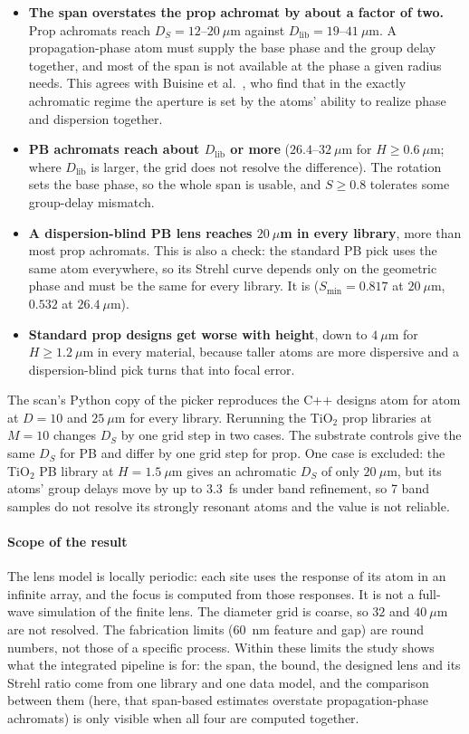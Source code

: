 \documentclass[preprint,12pt]{elsarticle}
\begin{document}
\begin{itemize}
\item \textbf{The span overstates the prop achromat by about a factor of two.} Prop
      achromats reach $D_S=12$--$20~\mu$m against $D_\mathrm{lib}=19$--$41~\mu$m. A
      propagation-phase atom must supply the base phase and the group delay together, and
      most of the span is not available at the phase a given radius needs. This agrees
      with Buisine et al.~\cite{buisine2026}, who find that in the exactly achromatic
      regime the aperture is set by the atoms' ability to realize phase and dispersion
      together.
\item \textbf{PB achromats reach about $D_\mathrm{lib}$ or more} ($26.4$--$32~\mu$m for
      $H\ge0.6~\mu$m; where $D_\mathrm{lib}$ is larger, the grid does not resolve the
      difference). The rotation sets the base phase, so the whole span is usable, and
      $S\ge0.8$ tolerates some group-delay mismatch.
\item \textbf{A dispersion-blind PB lens reaches $20~\mu$m in every library}, more than
      most prop achromats. This is also a check: the standard PB pick uses the same atom
      everywhere, so its Strehl curve depends only on the geometric phase and must be the
      same for every library. It is ($S_\mathrm{min}=0.817$ at $20~\mu$m, $0.532$ at
      $26.4~\mu$m).
\item \textbf{Standard prop designs get worse with height}, down to $4~\mu$m for
      $H\ge1.2~\mu$m in every material, because taller
      atoms are more dispersive and a dispersion-blind pick turns that into focal error.
\end{itemize}
The scan's Python copy of the picker reproduces the C++ designs atom for atom at
$D=10$ and $25~\mu$m for every library. Rerunning the TiO$_2$ prop libraries at $M=10$
changes $D_S$ by one grid step in two cases. The substrate controls give the same $D_S$
for PB and differ by one grid step for prop. One case is excluded: the TiO$_2$ PB library at
$H=1.5~\mu$m gives an achromatic $D_S$ of only $20~\mu$m, but its atoms' group delays move
by up to $3.3$~fs under band refinement, so 7 band samples do not resolve its strongly
resonant atoms and the value is not reliable.

\paragraph{Scope of the result}
The lens model is locally periodic: each site uses the response of its atom in an
infinite array, and the focus is computed from those responses. It is not a full-wave
simulation of the finite lens. The diameter grid is coarse, so $32$ and $40~\mu$m are not
resolved. The fabrication limits ($60$~nm feature and gap) are round numbers, not those
of a specific process. Within these limits the study shows what the integrated pipeline
is for: the span, the bound, the designed lens and its Strehl ratio come from one
library and one data model, and the comparison between them (here, that span-based
estimates overstate propagation-phase achromats) is only visible when all four are
computed together.
\end{document}
